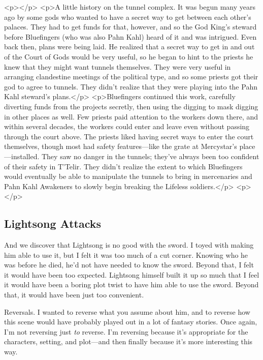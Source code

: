 <p></p>
<p>A little history on the tunnel complex. It was begun many years ago by some gods who wanted to have a secret way to get between each other’s palaces. They had to get funds for that, however, and so the God King’s steward before Bluefingers (who was also Pahn Kahl) heard of it and was intrigued. Even back then, plans were being laid. He realized that a secret way to get in and out of the Court of Gods would be very useful, so he began to hint to the priests he knew that they might want tunnels themselves. They were very useful in arranging clandestine meetings of the political type, and so some priests got their god to agree to tunnels. They didn’t realize that they were playing into the Pahn Kahl steward’s plans.</p>
<p>Bluefingers continued this work, carefully diverting funds from the projects secretly, then using the digging to mask digging in other places as well. Few priests paid attention to the workers down there, and within several decades, the workers could enter and leave even without passing through the court above. The priests liked having secret ways to enter the court themselves, though most had safety features—like the grate at Mercystar’s place—installed. They saw no danger in the tunnels; they’ve always been too confident of their safety in T’Telir. They didn’t realize the extent to which Bluefingers would eventually be able to manipulate the tunnels to bring in mercenaries and Pahn Kahl Awakeners to slowly begin breaking the Lifeless soldiers.</p>
<p></p>

\subsection*{Lightsong Attacks}

And we discover that Lightsong is no good with the sword. I toyed with making him able to use it, but I felt it was too much of a cut corner. Knowing who he was before he died, he’d not have needed to know the sword. Beyond that, I felt it would have been too expected. Lightsong himself built it up so much that I feel it would have been a boring plot twist to have him able to use the sword. Beyond that, it would have been just too convenient.

Reversals. I wanted to reverse what you assume about him, and to reverse how this scene would have probably played out in a lot of fantasy stories. Once again, I’m not reversing just \textit{to} reverse. I’m reversing because it’s appropriate for the characters, setting, and plot—and then finally because it’s more interesting this way.



